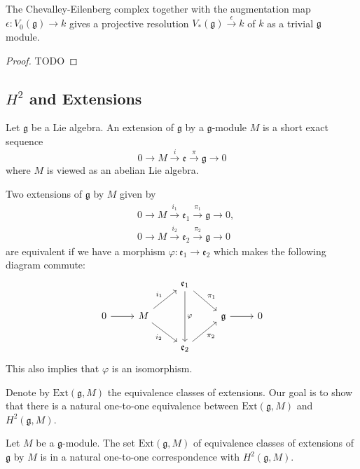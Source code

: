 \begin{theorem}
  The Chevalley-Eilenberg complex together with the augmentation map $ \epsilon: V_0(\mathfrak{g}) \to k $ gives a projective resolution $ V_*(\mathfrak{g}) \xrightarrow{\epsilon} k $ of $ k $ as a trivial $ \mathfrak{g} $ module.
\end{theorem}
\begin{proof}
  TODO
\end{proof}

\subsection{$ H^2 $ and Extensions} %
\label{sec:Lie Algebra Extensions}
\begin{definition}
  Let $ \mathfrak{g} $ be a Lie algebra. An extension of $ \mathfrak{g} $ by a $ \mathfrak{g} $-module $ M $ is a short exact sequence
  \begin{equation}
    0 \to M \xrightarrow{i} \mathfrak{e} \xrightarrow{\pi} \mathfrak{g} \to 0
    \label{eq:extension}
  \end{equation}
  where $ M $ is viewed as an abelian Lie algebra.
\end{definition}
\begin{definition}
  Two extensions of $ \mathfrak{g} $ by $ M $ given by
  \begin{align*}
    &0 \to M \xrightarrow{i_1} \mathfrak{e}_1 \xrightarrow{\pi_1} \mathfrak{g} \to 0,\\
    &0 \to M \xrightarrow{i_2} \mathfrak{e}_2 \xrightarrow{\pi_2} \mathfrak{g} \to 0
  \end{align*}
  are equivalent if we have a morphism $ \varphi: \mathfrak{e}_1 \to \mathfrak{e}_2 $ which makes the following diagram commute:
  \[\begin{tikzcd}
	&& {\mathfrak{e}_1} \\
	  0 & M && {\mathfrak{g}} & 0 \\
	    && {\mathfrak{e}_2}
	    \arrow[from=2-1, to=2-2]
	    \arrow["\varphi", from=1-3, to=3-3]
	    \arrow["{i_1}", from=2-2, to=1-3]
	    \arrow["{i_2}"', from=2-2, to=3-3]
	    \arrow["{\pi_2}"', from=3-3, to=2-4]
	    \arrow["{\pi_1}", from=1-3, to=2-4]
	    \arrow[from=2-4, to=2-5]
  \end{tikzcd}\]
  This also implies that $ \varphi $ is an isomorphism.
\end{definition}
Denote by $ \text{Ext}(\mathfrak{g}, M) $ the equivalence classes of extensions. Our goal is to show that there is a natural one-to-one equivalence between $ \text{Ext}(\mathfrak{g}, M) $ and $ H^2(\mathfrak{g}, M) $.

\begin{theorem}
  Let $ M $ be a $ \mathfrak{g} $-module. The set $ \text{Ext}(\mathfrak{g}, M) $ of equivalence classes of extensions of $ \mathfrak{g} $ by $ M $ is in a natural one-to-one correspondence with $ H^2(\mathfrak{g}, M) $.
\end{theorem}
